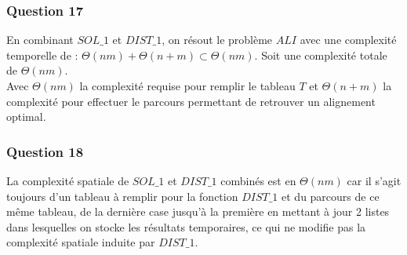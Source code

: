 \documentclass[12pt, a4paper]{report}
\begin{document}
\subsubsection{Question 17}
En combinant $SOL\_1$ et $DIST\_1$, on résout le problème $ALI$ avec une complexité temporelle de : $\Theta(nm)+\Theta(n+m) \subset \Theta(nm)$. Soit une complexité totale de $\Theta(nm)$.\\
Avec $\Theta(nm)$ la complexité requise pour remplir le tableau $T$ et $\Theta(n+m)$ la complexité pour effectuer le parcours permettant de retrouver un alignement optimal.

\subsubsection{Question 18}
La complexité spatiale de $SOL\_1$ et $DIST\_1$ combinés est en  $\Theta(nm)$ car il s'agit toujours d'un tableau à remplir pour la fonction $DIST\_1$ et du parcours de ce même tableau, de la dernière case jusqu'à la première en mettant à jour 2 listes dans lesquelles on stocke les résultats temporaires, ce qui ne modifie pas la complexité spatiale induite par  $DIST\_1$.  
\end{document}
